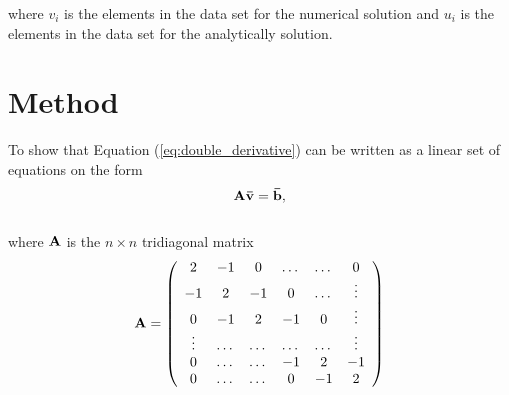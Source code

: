 \documentclass[12pt]{article}
\begin{document}
\begin{flushleft}
where $v_i$ is the elements in the data set for the numerical solution and $u_i$ is the elements in the data set for the analytically solution.

\newpage

\section*{Method}
To show that Equation (\ref{eq:double_derivative}) can be written as a linear set of equations on the form\\

\begin{equation}\label{eq:matrix_eq}
{\bf A}{\bf \bar{v}} = {\bf \bar{b}},
\end{equation}\\

where ${\bf A}$ is the $n\times n$  tridiagonal matrix\\
 \vspace{5mm}
\begin{equation}\label{matrix:tridiag_deriv}
{\bf A} = 
    \left(\begin{array}{cccccc}
    2& -1& 0 &\dots   & \dots &0 \\
    -1 & 2 & -1 &0 &\dots &\vdots \\
     0&-1 &2 & -1 & 0 & \vdots \\
     \vdots & \dots   & \dots &\dots   &\dots & \vdots \\
     0&\dots   &\dots  &-1 &2& -1 \\
     0&\dots    &\dots  & 0  &-1 & 2 \\
    \end{array} \right)
\end{equation}\\
    
\vspace{5mm}


\end{flushleft}
\end{document}
